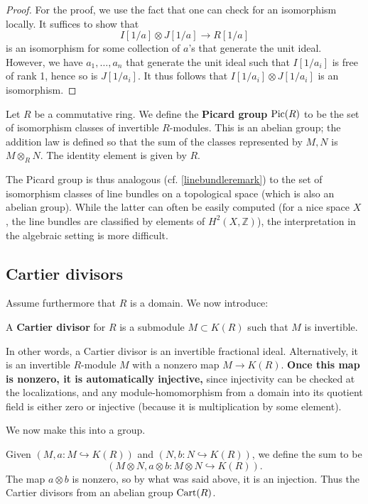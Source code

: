 \begin{proof}
For the proof, we use the fact that one can check for an isomorphism locally.  
It suffices to show that 
\[ I[1/a] \otimes J[1/a] \to R[1/a]  \]
is an isomorphism for some collection of $a$'s that generate the unit ideal.
However, we have $a_1, \dots, a_n$ that generate the unit ideal such that
$I[1/a_i]$ is free of rank 1, hence so is $J[1/a_i]$. It thus follows that
$I[1/a_i] \otimes J[1/a_i]$ is an isomorphism.
\end{proof} 


\begin{definition} 
Let $R$ be a commutative ring. We define the \textbf{Picard group} $\operatorname{Pic}(R)$ to
be the set of isomorphism classes of invertible $R$-modules. This is an abelian
group; the addition law is defined so that the sum of the classes represented
by $M, N$ is $M \otimes_R N$.
The identity element is given by $R$. 
\end{definition} 

The Picard group is thus analogous (cf. \cref{linebundleremark}) to the set of
isomorphism classes of line bundles on a topological space (which is also an
abelian group). While the latter can often be easily computed (for a nice space
$X$, the line bundles are classified by elements of $H^2(X, \mathbb{Z})$), the
interpretation in the algebraic setting is more difficult. 
\subsection{Cartier divisors}

Assume furthermore that $R$ is a domain. We now introduce:

\begin{definition} 
A \textbf{Cartier divisor} for $R$ is a submodule $M \subset K(R)$ such that
$M$ is invertible. 
\end{definition} 
In other words, a Cartier divisor is an invertible fractional ideal.
Alternatively, it is an invertible $R$-module $M$ with a nonzero map $M \to
K(R)$. \textbf{ Once this map is nonzero, it is automatically injective,} since
injectivity can be checked at the localizations, and any module-homomorphism from a domain into
its quotient field is either zero or injective (because it is multiplication by
some element). 


We now make this into a group. 
\begin{definition} 
Given $(M, a: M \hookrightarrow K(R))$ and $(N, b: N \hookrightarrow K(R))$, we
define the sum to be 
\[  (M \otimes N, a \otimes b: M \otimes N \hookrightarrow K(R)). \]
The map $a \otimes b$ is nonzero, so by what was said above, it is an injection.
Thus the Cartier divisors from an abelian group $\operatorname{Cart}(R)$.
\end{definition} 

